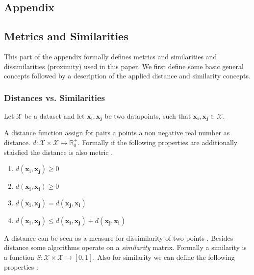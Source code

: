 \documentclass[12pt,a4paper,bibliography=totocnumbered,listof=totocnumbered]{scrartcl}
\begin{document}
\begin{appendix}
	
\section*{Appendix}
{}

\subsection*{Metrics and Similarities}

This part of the appendix formally defines metrics and similarities and dissimilarities (proximity) used in this paper. We first define some basic general concepts followed by a description of the applied distance and similarity concepts. 

\subsubsection*{Distances vs. Similarities}

Let $\mathcal{X}$ be a dataset and let $\boldsymbol{x_i},\boldsymbol{x_j}$ be two datapoints, such that $\boldsymbol{x_i},\boldsymbol{x_j} \in \mathcal{X}$. 

A distance function assign for pairs a points a non negative real number as distance. $d:\mathcal{X}\times \mathcal{X} \mapsto \mathbb{R}_0^+$. Formally if the following properties are additionally staisfied the distance is also metric \cite[page 28]{Shirali06a}.

\begin{enumerate}
	\setlength{\itemsep}{-5pt}
	\item $d(\boldsymbol{x_i},\boldsymbol{x_j}) \ge 0$
	\item $d(\boldsymbol{x_i},\boldsymbol{x_i}) \ge 0$
	\item $d(\boldsymbol{x_i},\boldsymbol{x_j}) = d(\boldsymbol{x_j},\boldsymbol{x_i}) $
	\item $d(\boldsymbol{x_i},\boldsymbol{x_j}) \le d(\boldsymbol{x_i},\boldsymbol{x_j})+ d(\boldsymbol{x_j},\boldsymbol{x_i}) $
\end{enumerate}

A distance can be seen as a measure for dissimilarity of two points \cite[page 35]{Everitt2009}. Besides distance some algorithms operate on a \textit{similarity} matrix. Formally a similarity is a function  $ S : \mathcal{X} \times \mathcal{X} \mapsto [0,1] $. Also for similarity we can define the following properties \cite[page 3]{Fratev1979}:


\end{appendix}
\end{document}

